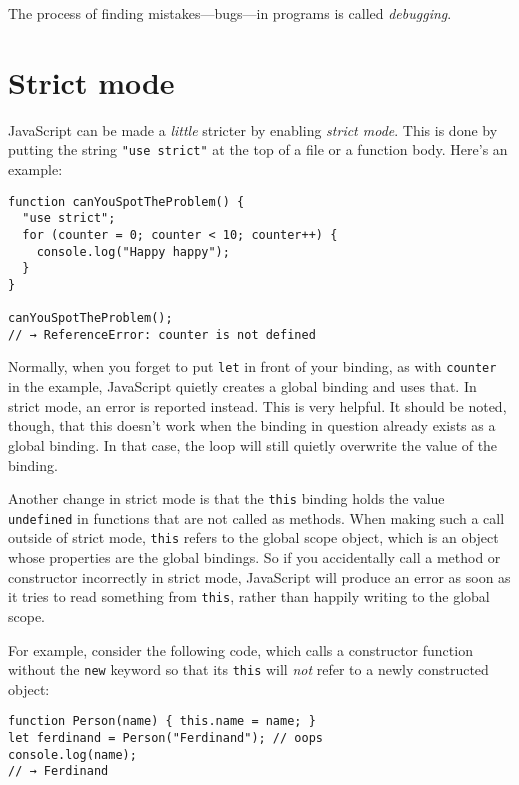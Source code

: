 The process of finding mistakes—bugs—in programs is called \emph{debugging}.

\section{Strict mode}

JavaScript can be made a \emph{little} stricter by enabling \emph{strict mode}. This is done by putting the string \lstinline`"use strict"` at the top of a file or a function body. Here's an example:

\begin{lstlisting}
function canYouSpotTheProblem() {
  "use strict";
  for (counter = 0; counter < 10; counter++) {
    console.log("Happy happy");
  }
}

canYouSpotTheProblem();
// → ReferenceError: counter is not defined
\end{lstlisting}
\noindent{}

Normally, when you forget to put \lstinline`let` in front of your binding, as with \lstinline`counter` in the example, JavaScript quietly creates a global binding and uses that. In strict mode, an error is reported instead. This is very helpful. It should be noted, though, that this doesn't work when the binding in question already exists as a global binding. In that case, the loop will still quietly overwrite the value of the binding.

Another change in strict mode is that the \lstinline`this` binding holds the value \lstinline`undefined` in functions that are not called as methods. When making such a call outside of strict mode, \lstinline`this` refers to the global scope object, which is an object whose properties are the global bindings. So if you accidentally call a method or constructor incorrectly in strict mode, JavaScript will produce an error as soon as it tries to read something from \lstinline`this`, rather than happily writing to the global scope.

For example, consider the following code, which calls a constructor function without the \lstinline`new` keyword so that its \lstinline`this` will \emph{not} refer to a newly constructed object:

\begin{lstlisting}
function Person(name) { this.name = name; }
let ferdinand = Person("Ferdinand"); // oops
console.log(name);
// → Ferdinand
\end{lstlisting}
\noindent{}

